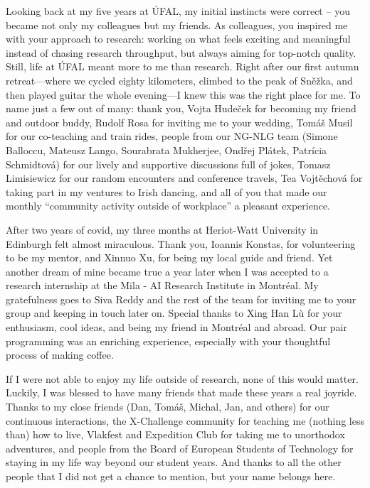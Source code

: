 \documentclass[12pt,notitlepage,a4paper,openright]{report}
\begin{document}
{    Looking back at my five years at ÚFAL, my initial instincts were correct -- you became not only my colleagues but my friends.
    As colleagues, you inspired me with your approach to research: working on what feels exciting and meaningful instead of chasing research throughput, but always aiming for top-notch quality. Still, life at ÚFAL meant more to me than research. Right after our first autumn retreat---where we cycled eighty kilometers, climbed to the peak of Sněžka, and then played guitar the whole evening---I knew this was the right place for me. To name just a few out of many: thank you, Vojta Hudeček for becoming my friend and outdoor buddy, Rudolf Rosa for inviting me to your wedding, Tomáš Musil for our co-teaching and train rides, people from our NG-NLG team (Simone Balloccu, Mateusz Lango, Sourabrata Mukherjee, Ondřej Plátek, Patrícia Schmidtová) for our lively and supportive discussions full of jokes, Tomasz Limisiewicz for our random encounters and conference travels, Tea Vojtěchová for taking part in my ventures to Irish dancing, and all of you that made our monthly ``community activity outside of workplace'' a pleasant experience.

    After two years of covid, my three months at Heriot-Watt University in Edinburgh felt almost miraculous. Thank you, Ioannis Konstas, for volunteering to be my mentor, and Xinnuo Xu, for being my local guide and friend. Yet another dream of mine became true a year later when I was accepted to a research internship at the Mila - AI Research Institute in Montréal. My gratefulness goes to Siva Reddy and the rest of the team for inviting me to your group and keeping in touch later on. Special thanks to Xing Han Lù for your enthusiasm, cool ideas, and being my friend in Montréal and abroad. Our pair programming was an enriching experience, especially with your thoughtful process of making coffee.

    If I were not able to enjoy my life outside of research, none of this would matter. Luckily, I was blessed to have many friends that made these years a real joyride. Thanks to my close friends (Dan, Tomáš, Michal, Jan, and others) for our continuous interactions, the X-Challenge community for teaching me (nothing less than) how to live, Vlakfest and Expedition Club for taking me to unorthodox adventures, and people from the Board of European Students of Technology for staying in my life way beyond our student years. And thanks to all the other people that I did not get a chance to mention, but your name belongs here.

}
\end{document}

